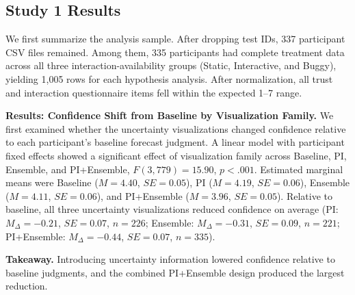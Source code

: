 \subsection{Study 1 Results}
We first summarize the analysis sample. After dropping test IDs, 337 participant CSV files remained. Among them, 335 participants had complete treatment data across all three interaction-availability groups (Static, Interactive, and Buggy), yielding 1{,}005 rows for each hypothesis analysis. After normalization, all trust and interaction questionnaire items fell within the expected 1--7 range.

\noindent\textbf{Results: Confidence Shift from Baseline by Visualization Family.}
We first examined whether the uncertainty visualizations changed confidence relative to each participant's baseline forecast judgment. A linear model with participant fixed effects showed a significant effect of visualization family across Baseline, PI, Ensemble, and PI+Ensemble, $F(3, 779)=15.90$, $p<.001$. Estimated marginal means were Baseline ($M=4.40$, $SE=0.05$), PI ($M=4.19$, $SE=0.06$), Ensemble ($M=4.11$, $SE=0.06$), and PI+Ensemble ($M=3.96$, $SE=0.05$). Relative to baseline, all three uncertainty visualizations reduced confidence on average (PI: $M_{\Delta}=-0.21$, $SE=0.07$, $n=226$; Ensemble: $M_{\Delta}=-0.31$, $SE=0.09$, $n=221$; PI+Ensemble: $M_{\Delta}=-0.44$, $SE=0.07$, $n=335$).

\noindent\textbf{Takeaway.}
Introducing uncertainty information lowered confidence relative to baseline judgments, and the combined PI+Ensemble design produced the largest reduction.

